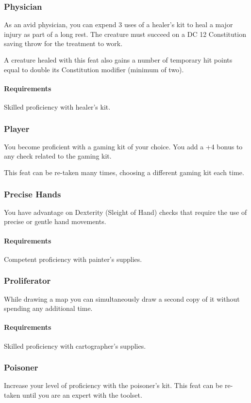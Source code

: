 \subsubsection{Physician} \label{feat::physician}
    As an avid physician, you can expend 3 uses of a healer's kit to heal a major injury as part of a long rest.
    The creature must succeed on a DC 12 Constitution saving throw for the treatment to work.

    A creature healed with this feat also gains a number of temporary hit points equal to double its Constitution modifier (minimum of two).
    \paragraph{Requirements} Skilled proficiency with healer's kit.
\subsubsection{Player} \label{feat::player}
    You become proficient with a gaming kit of your choice.
    You add a +4 bonus to any check related to the gaming kit.

    This feat can be re-taken many times, choosing a different gaming kit each time.
\subsubsection{Precise Hands} \label{feat::precisehands}
    You have advantage on Dexterity (Sleight of Hand) checks that require the use of precise or gentle hand movements.
    \paragraph{Requirements} Competent proficiency with painter's supplies.
\subsubsection{Proliferator} \label{feat::proliferator}
    While drawing a map you can simultaneously draw a second copy of it without spending any additional time.
    \paragraph{Requirements} Skilled proficiency with cartographer's supplies.
\subsubsection{Poisoner} \label{feat::poisoner}
    Increase your level of proficiency with the poisoner's kit.
    This feat can be re-taken until you are an expert with the toolset.

